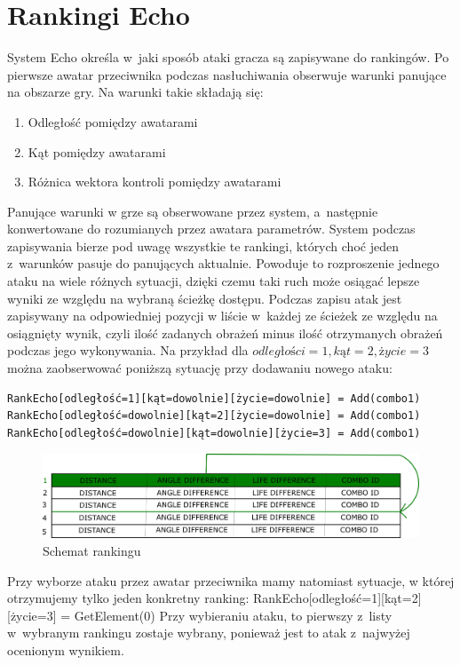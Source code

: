 \documentclass[brudnopis]{xmgr}
\begin{document}
\section{Rankingi Echo}
System Echo określa w~jaki sposób ataki gracza są zapisywane do
rankingów. Po pierwsze awatar przeciwnika podczas nasłuchiwania obserwuje warunki
panujące na obszarze gry. Na warunki takie składają się:
\begin{enumerate}
\item Odległość pomiędzy awatarami
\item Kąt pomiędzy awatarami
\item Różnica wektora kontroli pomiędzy awatarami
\end{enumerate}
Panujące warunki w grze są obserwowane przez system, a~następnie
konwertowane do rozumianych przez awatara parametrów. System podczas zapisywania bierze pod uwagę wszystkie te rankingi, których choć jeden z~warunków
pasuje do panujących aktualnie. Powoduje to rozproszenie jednego ataku na
wiele różnych sytuacji, dzięki czemu taki ruch może osiągać lepsze wyniki
ze względu na wybraną ścieżkę
dostępu. Podczas zapisu atak jest zapisywany na odpowiedniej pozycji w
liście w~każdej ze ścieżek ze względu na osiągnięty wynik, czyli ilość
zadanych obrażeń minus ilość otrzymanych obrażeń podczas jego
wykonywania.
Na przykład dla $odległości = 1, kąt = 2, życie = 3$ można zaobserwować
poniższą sytuację przy dodawaniu nowego ataku:
\begin{verbatim}
RankEcho[odległość=1][kąt=dowolnie][życie=dowolnie] = Add(combo1)
RankEcho[odległość=dowolnie][kąt=2][życie=dowolnie] = Add(combo1)
RankEcho[odległość=dowolnie][kąt=dowolnie][życie=3] = Add(combo1)
\end{verbatim}
\begin{figure}[!tbh]
\centering
\includegraphics[width=.8\hsize]{fig/echoRankExample}
\caption{Schemat rankingu\label{RYS.5}}
\end{figure}
Przy wyborze ataku przez awatar przeciwnika mamy natomiast sytuacje, w
której otrzymujemy tylko jeden konkretny ranking:
RankEcho[odległość=1][kąt=2][życie=3] = GetElement(0)
Przy wybieraniu ataku, to pierwszy z~listy w~wybranym rankingu zostaje
wybrany, ponieważ jest to atak z~najwyżej ocenionym wynikiem.
\end{document}
